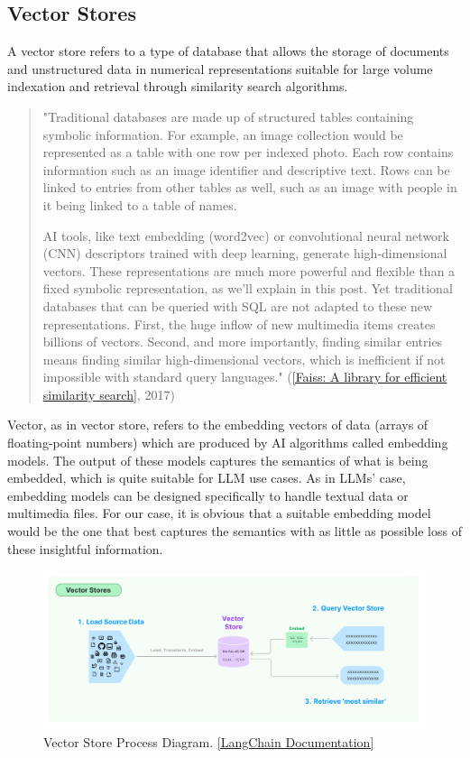 \subsection{Vector Stores}
A vector store refers to a type of database that allows the storage of documents and unstructured data in numerical representations suitable for large volume indexation and retrieval through similarity search algorithms.
\begin{quote}
    "Traditional databases are made up of structured tables containing symbolic information. For example, an image collection would be represented as a table with one row per indexed photo. Each row contains information such as an image identifier and descriptive text. Rows can be linked to entries from other tables as well, such as an image with people in it being linked to a table of names.

    AI tools, like text embedding (word2vec) or convolutional neural network (CNN) descriptors trained with deep learning, generate high-dimensional vectors. These representations are much more powerful and flexible than a fixed symbolic representation, as we’ll explain in this post. Yet traditional databases that can be queried with SQL are not adapted to these new representations. First, the huge inflow of new multimedia items creates billions of vectors. Second, and more importantly, finding similar entries means finding similar high-dimensional vectors, which is inefficient if not impossible with standard query languages."  (\href{https://engineering.fb.com/2017/03/29/data-infrastructure/faiss-a-library-for-efficient-similarity-search/}{[Faiss: A library for efficient similarity search]}, 2017)
\end{quote}
Vector, as in vector store, refers to the embedding vectors of data (arrays of floating-point numbers) which are produced by AI algorithms called embedding models. The output of these models captures the semantics of what is being embedded, which is quite suitable for LLM use cases.\newline
As in LLMs' case, embedding models can be designed specifically to handle textual data or multimedia files. For our case, it is obvious that a suitable embedding model would be the one that best captures the semantics with as little as possible loss of these insightful information.\newpage
\begin{figure}[htbp]
    \centering
    \includegraphics[width=\linewidth]{./figures/vectorstore.jpg}
    \caption{Vector Store Process Diagram. \href{https://python.langchain.com/v0.1/docs/modules/data_connection/vectorstores/}{[LangChain Documentation]}}
\end{figure}
